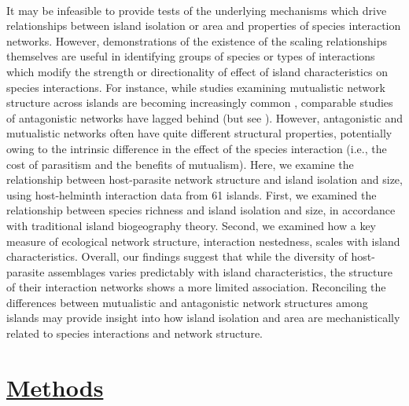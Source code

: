 \paragraph*{}
It may be infeasible to provide tests of the underlying mechanisms which drive relationships between island isolation or area and properties of species interaction networks. However, demonstrations of the existence of the scaling relationships themselves are useful in identifying groups of species or types of interactions which modify the strength or directionality of effect of island characteristics on species interactions. For instance, while studies examining mutualistic network structure across islands are becoming increasingly common \parencite{traveset2016, dalsgaard2013, sugiura2010, trojelsgaard2013}, comparable studies of antagonistic networks have lagged behind (but see \textcite{gravel2011}). However, antagonistic and mutualistic networks often have quite different structural properties, potentially owing to the intrinsic difference in the effect of the species interaction (i.e., the cost of parasitism and the benefits of mutualism). Here, we examine the relationship between host-parasite network structure and island isolation and size, using host-helminth interaction data from 61 islands. First, we examined the relationship between species richness and island isolation and size, in accordance with traditional island biogeography theory. Second, we examined how a key measure of ecological network structure, interaction nestedness, scales with island characteristics. Overall, our findings suggest that while the diversity of host-parasite assemblages varies predictably with island characteristics, the structure of their interaction networks shows a more limited association. Reconciling the differences between mutualistic and antagonistic network structures among islands may provide insight into how island isolation and area are mechanistically related to species interactions and network structure.














\section*{\textbf{\underline{Methods}}}

